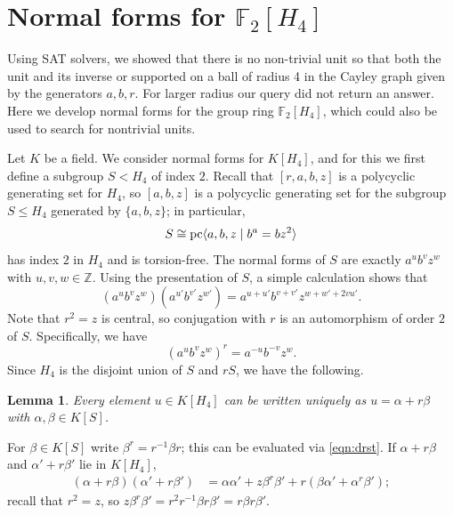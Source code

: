 \documentclass[11pt]{amsart}
\theoremstyle{mythm}
\newtheorem{lemma}[theorem]{Lemma}
\theoremstyle{mydef}
\theoremstyle{myrem}
\numberwithin{equation}{section}
\renewcommand{\leq}{\leqslant}
\newcommand{\Z}{\mathbb{Z}}
\begin{document}
 \section{Normal forms for  $\mathbb{F}_2[H_4]$}\label{sec_nut2}
\label{sec_norm} 
\noindent Using SAT solvers, we  showed that there is  no  non-trivial unit so that both the unit and its inverse or supported on a ball of radius 4 in the Cayley graph given by the generators $a,b,r$. For larger radius our query did not return  an answer. Here we develop    normal forms for the group ring $\mathbb{F}_2[H_4]$, which could also be used to search for nontrivial units. 


Let $K$ be a field. We   consider normal forms for $K[H_4]$, and for this we first define a subgroup $S<H_4$ of index $2$. Recall that $[r,a,b,z]$ is a polycyclic generating set for $H_4$, so $[a,b,z]$ is a polycyclic generating set for the subgroup $S\leq H_4$ generated by $\{a,b,z\}$; in particular, \[S\cong {\rm pc}\langle a,b,z \mid b^a = bz^2\rangle\] has index $2$ in $H_4$ and is torsion-free. The normal forms of $S$ are exactly $a^ub^vz^w$ with $u,v,w\in\Z$. Using the presentation of $S$, a simple calculation shows that
\begin{equation} \label{eqn:rst}(a^ub^vz^w)(a^{u'}b^{v'}z^{w'})= a^{u+u'}b^{v+v'}z^{w+w'+2vu'}.
\end{equation}
Note that $r^2=z$ is central, so conjugation with $r$ is an automorphism of order $2$ of  $S$. Specifically, we have
\begin{equation} \label{eqn:drst}(a^u b^v z^w)^r = a^{-u} b^{-v} z^{w}.
\end{equation}
Since $H_4$ is the disjoint union of $S$ and $rS$, we have the following.

\begin{lemma} Every element $u \in  K[H_4]$ can be written uniquely as $u= \alpha + r\beta$ with $\alpha,\beta \in K[S]$.
\end{lemma}
For $\beta\in K[S]$ write $\beta^r=r^{-1}\beta r$; this can be evaluated via \eqref{eqn:drst}. If $\alpha+r\beta$ and $\alpha'+r\beta'$ lie in $K[H_4]$, 
\begin{align}\label{eq_nfs}(\alpha+r\beta)(\alpha'+r\beta')&=\alpha\alpha' + z \beta^r\beta' +r(\beta\alpha' + \alpha^r\beta');
\end{align}
recall that $r^2=z$, so $z\beta^r\beta'=r^2r^{-1}\beta r \beta'=r\beta r \beta'$.  

 
\end{document}
